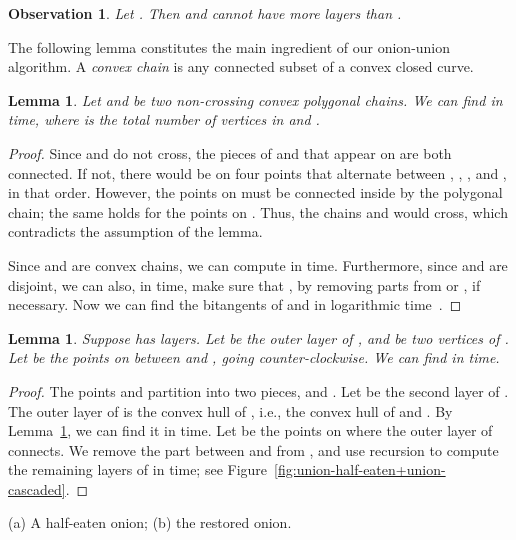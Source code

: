 \documentclass{paper}
\newtheorem{lemma}[theorem]{Lemma}
\newtheorem{obs}[theorem]{Observation}
\begin{document}
\begin {obs} \label {obs:k}
  Let . 
  Then  and  cannot have more layers than 
  . \hfill
\end {obs}

The following lemma constitutes the main ingredient of our onion-union 
algorithm.  A \emph{convex chain} is any connected subset 
of a convex closed curve. 

\begin{lemma} \label{lem:chainhull}
  Let  and  be two non-crossing convex polygonal chains. We can find 
   in  time, where  is the total number
  of vertices in  and .
\end{lemma}

\begin{proof}
  Since  and  do not cross, the pieces of  and  that appear on 
   are both connected. If not, there would be on  
  four points that alternate between , , , and , in that order. 
  However, the points on  must be connected inside  by
  the polygonal chain; 
  the same holds for the points on . Thus, the chains  and  would cross, which 
  contradicts the assumption of the lemma. 

  Since  and  are convex chains, we can compute
   in  time. Furthermore, since  and 
  are disjoint, we can also, in  time, make sure that
  , by removing parts from  or ,
  if necessary.
  Now we can 
  find the bitangents of  and  in 
  logarithmic time~\cite {ks-cctws-95}.
\end{proof}

\begin{lemma} \label{lem:restore}
  Suppose  has  layers. Let  be the outer layer of
  , and  be two vertices of . 
  Let  be the points on  between  and , going counter-clockwise. 
  We can find 
   in  time.
\end{lemma}

\begin{proof}
  The points  and  partition   into two pieces,  and . 
  Let  be the second layer of .
  The outer layer of  is the convex hull of 
  , 
  i.e., the convex hull of  and . 
  By Lemma~\ref {lem:chainhull}, we can find it in  time.
  Let  be the points on  where the outer 
  layer of  connects.
  We remove the part between  and  from , and
  use recursion to compute the remaining layers of  
  in  time; see
  Figure~\ref{fig:union-half-eaten+union-cascaded}.
\end{proof}

{ (a) A half-eaten onion; (b) the restored 
onion.}
\end{document}
